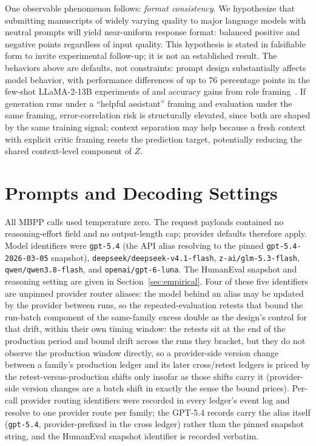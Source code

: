 \documentclass[a4paper,journal]{IAENGtran}
\begin{document}
One observable phenomenon follows: \emph{format consistency}. We hypothesize that
submitting manuscripts of widely varying quality to major language models with neutral
prompts will yield near-uniform response format: balanced positive and negative points
regardless of input quality. This hypothesis is stated in falsifiable form to invite
experimental follow-up; it is not an established result. The behaviors above are
defaults, not constraints: prompt design substantially affects model behavior, with
performance differences of up to 76 percentage points in the few-shot LLaMA-2-13B
experiments of \cite{sclar2024formatting} and accuracy gains from role
framing~\cite{kong2023roleplay}. If generation runs under a ``helpful assistant''
framing and evaluation under the same framing, error-correlation risk is structurally
elevated, since both are shaped by the same training signal; context separation may
help because a fresh context with explicit critic framing resets the prediction
target, potentially reducing the shared context-level component of $Z$.


\section{Prompts and Decoding Settings}
\label{app:prompts}

All MBPP calls used temperature zero. The request payloads contained no
reasoning-effort field and no output-length cap; provider defaults therefore apply.
Model identifiers were \texttt{gpt-5.4} (the API alias resolving to the pinned
\texttt{gpt-5.4-2026-03-05} snapshot),
\texttt{deepseek/deepseek-v4.1-flash}, \texttt{z-ai/glm-5.3-flash},
\texttt{qwen/qwen3.8-flash}, and \texttt{openai/gpt-6-luna}. The HumanEval
snapshot and reasoning setting are given in Section~\ref{sec:empirical}.
Four of these five identifiers are unpinned provider router aliases: the model
behind an alias may be updated by the provider between runs, so the
repeated-evaluation retests that bound the run-batch component of the same-family
excess double as the design's control for that drift, within their own timing
window: the retests sit at the end of the production period and bound drift across
the runs they bracket, but they do not observe the production window directly, so a
provider-side version change between a family's production ledger and its later
cross/retest ledgers is priced by the retest-versus-production shifts only insofar
as those shifts carry it (provider-side version
changes are a batch shift in exactly the sense the bound prices).
Per-call provider routing identifiers were recorded in every ledger's event log and
resolve to one provider route per family; the GPT-5.4 records carry the alias itself
(\texttt{gpt-5.4}, provider-prefixed in the cross ledger) rather than the pinned
snapshot string, and the HumanEval snapshot identifier is recorded verbatim.
\end{document}

